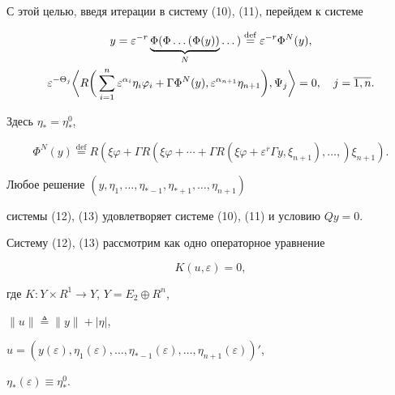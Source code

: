 С этой целью, введя итерации в систему (10), (11), перейдем к системе


\begin{gather}


y =\varepsilon^{-r} \underbrace{\Phi(\Phi\dotsc(\Phi(y))}_{N}\dotsc)


\overset{\mathrm{def}}{=}{} \varepsilon^{-r}\Phi^N(y),\\


%


\varepsilon^{-\Theta_j}


\bigg\la R\bigg(\sum^n_{i=1}\varepsilon^{\alpha_i}\eta_i\varphi_i


+ \Gamma\Phi^N(y), \varepsilon^{\alpha_{n+1}}\eta_{n+1}\bigg),


\Psi_j\bigg\ra  = 0,\quad


j=\overline{1,n}.


\end{gather}


Здесь $\eta_* = \eta^0_*$,


$$


\Phi^N(y) \overset{\mathrm{def}}{=}{} R(\xi\varphi + \Gamma R(\xi\varphi +


\dotsb + \Gamma R(\xi\varphi + \varepsilon^r\Gamma y,


\xi_{n+1}),\dotsc,)\xi_{n+1}).


$$


Любое решение $(y,\eta_1,\dotsc,\eta_{*-1},\eta_{*+1},\dotsc,\eta_{n+1})$


системы (12), (13) удовлетворяет системе (10), (11) и условию $Qy = 0$.





Систему (12), (13) рассмотрим как одно операторное уравнение


\begin{equation}


K(u,\varepsilon) = 0,


\end{equation}


где $K: Y\times R^1\rightarrow Y$, $Y = E_2 \oplus R^n$,


$\|u\|\triangleq \|y\| + |\eta|$,


$u = (y(\varepsilon),\eta_1(\varepsilon),\dotsc,


\eta_{*-1}(\varepsilon),\dotsc,


\eta_{n+1}(\varepsilon))'$,


$\eta_*(\varepsilon) \equiv \eta^0_*$.





